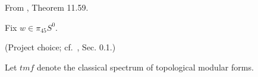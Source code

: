 \begin{definition}
\label{frontier:Literature:75fd0d147c9c}
From \cite{BR21}, Theorem 11.59.\par

Fix $w\in\pi_{45}S^0$.
\end{definition}

\begin{definition}
\label{frontier:Literature:79d2c0d8349e}
(Project choice; cf.\ \cite{BR21}, Sec. 0.1.)\par{}

Let $\mathit{tmf}$ denote the classical spectrum of topological modular forms.
\end{definition}

